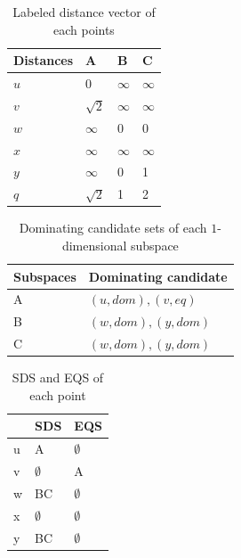 \begin{table}[h]
    \centering
    \begin{tabular}{llll}
    \hline
    Distances & A & B & C \\ \hline
    $u$       & 0 & $\infty$ & $\infty$ \\ \hline
    $v$       & $\sqrt{2}$ & $\infty$ & $\infty$ \\ \hline
    $w$       & $\infty$ & 0 & 0 \\ \hline
    $x$       & $\infty$ & $\infty$ & $\infty$ \\ \hline
    $y$       & $\infty$ & 0 & 1 \\ \hline
    $q$       & $\sqrt{2}$ & 1 & 2 \\ \hline
    \end{tabular}
    \caption{Labeled distance vector of each points}
    \label{tab:lv_spatial}
\end{table}

\begin{table}[H]
    \centering
    \begin{tabular}{|l|l|}
    \hline
    Subspaces & Dominating candidate \\ \hline
    A         & $(u, dom), (v, eq)$            \\ \hline
    B         & $(w, dom), (y, dom)$            \\ \hline
    C         & $(w, dom), (y, dom)$            \\ \hline
    \end{tabular}
    \caption{Dominating candidate sets of each $1$-dimensional subspace}
    \label{tab:cand_spatial}
\end{table}


\begin{table}[H]
    \centering
    \begin{tabular}{|l|l|l|}
    \hline
      & SDS         & EQS         \\ \hline
    u & A           & $\emptyset$ \\ \hline
    v & $\emptyset$ & A           \\ \hline
    w & BC          & $\emptyset$ \\ \hline
    x & $\emptyset$ & $\emptyset$ \\ \hline
    y & BC          & $\emptyset$ \\ \hline
    \end{tabular}
    \caption{SDS and EQS of each point}
    \label{tab:sds_spatial}
\end{table}


